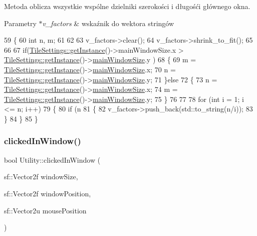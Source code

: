 Metoda oblicza wszystkie wspólne dzielniki szerokości i długośći głównego okna. 
\begin{DoxyParams}{Parametry}
{\em $\ast$v\+\_\+factors} & wskaźnik do wektora stringów \\
\hline
\end{DoxyParams}

\begin{DoxyCode}
59 \{
60     \textcolor{keywordtype}{int} n, m;
61 
62 
63     v\_factors->clear();
64     v\_factors->shrink\_to\_fit();
65 
66 
67     \textcolor{keywordflow}{if}(\mbox{\hyperlink{class_tile_settings_a003ae6e78b97855c8592b2b4c0818914}{TileSettings::getInstance}}()->mainWindowSize.x > 
      \mbox{\hyperlink{class_tile_settings_a003ae6e78b97855c8592b2b4c0818914}{TileSettings::getInstance}}()->\mbox{\hyperlink{class_tile_settings_a2b24689813e0082b59df113b754778c2}{mainWindowSize}}.y )
68     \{
69         m = \mbox{\hyperlink{class_tile_settings_a003ae6e78b97855c8592b2b4c0818914}{TileSettings::getInstance}}()->\mbox{\hyperlink{class_tile_settings_a2b24689813e0082b59df113b754778c2}{mainWindowSize}}.x;
70         n = \mbox{\hyperlink{class_tile_settings_a003ae6e78b97855c8592b2b4c0818914}{TileSettings::getInstance}}()->\mbox{\hyperlink{class_tile_settings_a2b24689813e0082b59df113b754778c2}{mainWindowSize}}.y;
71     \}\textcolor{keywordflow}{else}
72     \{
73         n = \mbox{\hyperlink{class_tile_settings_a003ae6e78b97855c8592b2b4c0818914}{TileSettings::getInstance}}()->\mbox{\hyperlink{class_tile_settings_a2b24689813e0082b59df113b754778c2}{mainWindowSize}}.x;
74         m = \mbox{\hyperlink{class_tile_settings_a003ae6e78b97855c8592b2b4c0818914}{TileSettings::getInstance}}()->\mbox{\hyperlink{class_tile_settings_a2b24689813e0082b59df113b754778c2}{mainWindowSize}}.y;
75     \}
76 
77 
78     \textcolor{keywordflow}{for} (\textcolor{keywordtype}{int} i = 1; i <= n; i++)
79     \{
80         \textcolor{keywordflow}{if} (n%
81         \{
82             v\_factors->push\_back(std::to\_string(n/i));
83         \}
84     \}
85 \}
\end{DoxyCode}
\mbox{\label{class_utility_a535e980c2716b8118deb78bef51079da}} 
\subsubsection{\texorpdfstring{clicked\+In\+Window()}{clickedInWindow()}}
{\footnotesize\ttfamily bool Utility\+::clicked\+In\+Window (\begin{DoxyParamCaption}\item[{sf\+::\+Vector2f}]{window\+Size,  }\item[{sf\+::\+Vector2f}]{window\+Position,  }\item[{sf\+::\+Vector2u}]{mouse\+Position }\end{DoxyParamCaption})}

